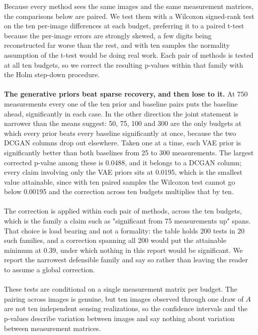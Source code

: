 Because every method sees the same images and the same measurement matrices, the comparisons below are paired. We test them with a Wilcoxon signed-rank test on the ten per-image differences at each budget, preferring it to a paired t-test because the per-image errors are strongly skewed, a few digits being reconstructed far worse than the rest, and with ten samples the normality assumption of the t-test would be doing real work. Each pair of methods is tested at all ten budgets, so we correct the resulting p-values within that family with the Holm step-down procedure.
\\\\
\textbf{The generative priors beat sparse recovery, and then lose to it.} At 750 measurements every one of the ten prior and baseline pairs puts the baseline ahead, significantly in each case. In the other direction the joint statement is narrower than the means suggest: 50, 75, 100 and 300 are the only budgets at which every prior beats every baseline significantly at once, because the two DCGAN columns drop out elsewhere. Taken one at a time, each VAE prior is significantly better than both baselines from 25 to 300 measurements. The largest corrected p-value among these is 0.0488, and it belongs to a DCGAN column; every claim involving only the VAE priors sits at 0.0195, which is the smallest value attainable, since with ten paired samples the Wilcoxon test cannot go below 0.00195 and the correction across ten budgets multiplies that by ten.
\\\\
The correction is applied within each pair of methods, across the ten budgets, which is the family a claim such as "significant from 75 measurements up" spans. That choice is load bearing and not a formality: the table holds 200 tests in 20 such families, and a correction spanning all 200 would put the attainable minimum at 0.39, under which nothing in this report would be significant. We report the narrowest defensible family and say so rather than leaving the reader to assume a global correction.
\\\\
These tests are conditional on a single measurement matrix per budget. The pairing across images is genuine, but ten images observed through one draw of \( A \) are not ten independent sensing realizations, so the confidence intervals and the p-values describe variation between images and say nothing about variation between measurement matrices.
\\\\
